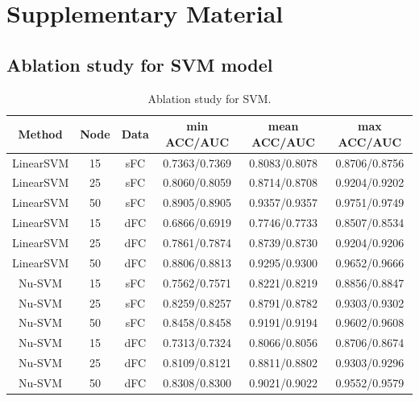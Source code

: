 \documentclass[11pt]{article}
\renewcommand\thesection{\arabic{section}}
\begin{document}



\newpage

\appendix
\renewcommand\thesection{\Alph{section}}

\section{Supplementary Material}

\subsection{Ablation study for SVM model}
\label{Ablation-study-for-SVM-model}

\begin{table}[H]
    \centering
    \begin{tabular}{|c|c|c|c|c|c|}
        \hline
        Method    & Node & Data & min ACC/AUC   & mean ACC/AUC  & max ACC/AUC   \\
        \hline
        LinearSVM & 15   & sFC  & 0.7363/0.7369 & 0.8083/0.8078 & 0.8706/0.8756 \\
        \hline
        LinearSVM & 25   & sFC  & 0.8060/0.8059 & 0.8714/0.8708 & 0.9204/0.9202 \\
        \hline
        LinearSVM & 50   & sFC  & 0.8905/0.8905 & 0.9357/0.9357 & 0.9751/0.9749 \\
        \hline
        LinearSVM & 15   & dFC  & 0.6866/0.6919 & 0.7746/0.7733 & 0.8507/0.8534 \\
        \hline
        LinearSVM & 25   & dFC  & 0.7861/0.7874 & 0.8739/0.8730 & 0.9204/0.9206 \\
        \hline
        LinearSVM & 50   & dFC  & 0.8806/0.8813 & 0.9295/0.9300 & 0.9652/0.9666 \\
        \hline
        Nu-SVM    & 15   & sFC  & 0.7562/0.7571 & 0.8221/0.8219 & 0.8856/0.8847 \\
        \hline
        Nu-SVM    & 25   & sFC  & 0.8259/0.8257 & 0.8791/0.8782 & 0.9303/0.9302 \\
        \hline
        Nu-SVM    & 50   & sFC  & 0.8458/0.8458 & 0.9191/0.9194 & 0.9602/0.9608 \\
        \hline
        Nu-SVM    & 15   & dFC  & 0.7313/0.7324 & 0.8066/0.8056 & 0.8706/0.8674 \\
        \hline
        Nu-SVM    & 25   & dFC  & 0.8109/0.8121 & 0.8811/0.8802 & 0.9303/0.9296 \\
        \hline
        Nu-SVM    & 50   & dFC  & 0.8308/0.8300 & 0.9021/0.9022 & 0.9552/0.9579 \\
        \hline
    \end{tabular}
    \caption{Ablation study for SVM.}
\end{table}
\end{document}
